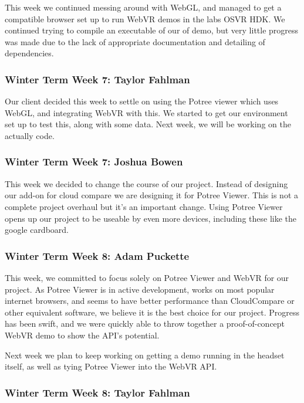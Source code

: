 \documentclass[draftclsnofoot,onecolumn]{IEEEtran}
\begin{document}
This week we continued messing around with WebGL, and managed to get a compatible browser set up to run WebVR demos in the labs OSVR HDK. We continued trying to compile an executable of our of demo, but very little progress was made due to the lack of appropriate documentation and detailing of dependencies.

\subsubsection{Winter Term Week 7: Taylor Fahlman}

Our client decided this week to settle on using the Potree viewer which uses WebGL, and integrating WebVR with this. We started to get our environment set up to test this, along with some data. Next week, we will be working on the actually code.

\subsubsection{Winter Term Week 7: Joshua Bowen}

This week we decided to change the course of our project. Instead of designing our add-on for cloud compare we are designing it for Potree Viewer. This is not a complete project overhaul but it's an important change. Using Potree Viewer opens up our project to be useable by even more devices, including these like the google cardboard.

\subsubsection{Winter Term Week 8: Adam Puckette}

This week, we committed to focus solely on Potree Viewer and WebVR for our project. As Potree Viewer is in active development, works on most popular internet browsers, and seems to have better performance than CloudCompare or other equivalent software, we believe it is the best choice for our project. Progress has been swift, and we were quickly able to throw together a proof-of-concept WebVR demo to show the API's potential.

Next week we plan to keep working on getting a demo running in the headset itself, as well as tying Potree Viewer into the WebVR API.

\subsubsection{Winter Term Week 8: Taylor Fahlman}
\end{document}
